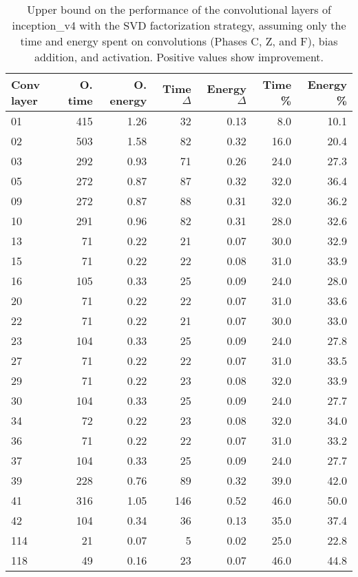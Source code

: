 \begin{table}
\centering
\begin{tabular}{|l|r|r|r|r|r|r|}
\hline
Conv layer & O. time & O. energy & Time $\Delta$ & Energy $\Delta$ & Time \% & Energy \% \\\hline
01 & 415 & 1.26 & 32 & 0.13 & 8.0 & 10.1 \\\hline
02 & 503 & 1.58 & 82 & 0.32 & 16.0 & 20.4 \\\hline
03 & 292 & 0.93 & 71 & 0.26 & 24.0 & 27.3 \\\hline
05 & 272 & 0.87 & 87 & 0.32 & 32.0 & 36.4 \\\hline
09 & 272 & 0.87 & 88 & 0.31 & 32.0 & 36.2 \\\hline
10 & 291 & 0.96 & 82 & 0.31 & 28.0 & 32.6 \\\hline
13 & 71 & 0.22 & 21 & 0.07 & 30.0 & 32.9 \\\hline
15 & 71 & 0.22 & 22 & 0.08 & 31.0 & 33.9 \\\hline
16 & 105 & 0.33 & 25 & 0.09 & 24.0 & 28.0 \\\hline
20 & 71 & 0.22 & 22 & 0.07 & 31.0 & 33.6 \\\hline
22 & 71 & 0.22 & 21 & 0.07 & 30.0 & 33.0 \\\hline
23 & 104 & 0.33 & 25 & 0.09 & 24.0 & 27.8 \\\hline
27 & 71 & 0.22 & 22 & 0.07 & 31.0 & 33.5 \\\hline
29 & 71 & 0.22 & 23 & 0.08 & 32.0 & 33.9 \\\hline
30 & 104 & 0.33 & 25 & 0.09 & 24.0 & 27.7 \\\hline
34 & 72 & 0.22 & 23 & 0.08 & 32.0 & 34.0 \\\hline
36 & 71 & 0.22 & 22 & 0.07 & 31.0 & 33.2 \\\hline
37 & 104 & 0.33 & 25 & 0.09 & 24.0 & 27.7 \\\hline
39 & 228 & 0.76 & 89 & 0.32 & 39.0 & 42.0 \\\hline
41 & 316 & 1.05 & 146 & 0.52 & 46.0 & 50.0 \\\hline
42 & 104 & 0.34 & 36 & 0.13 & 35.0 & 37.4 \\\hline
114 & 21 & 0.07 & 5 & 0.02 & 25.0 & 22.8 \\\hline
118 & 49 & 0.16 & 23 & 0.07 & 46.0 & 44.8 \\\hline
\end{tabular}
\caption{Upper bound on the performance of the convolutional layers of inception\_v4 with the SVD factorization strategy, assuming only the time and energy spent on convolutions (Phases C, Z, and F), bias addition, and activation. Positive values show improvement.}
\label{inception_v4-max-performance}
\end{table}

